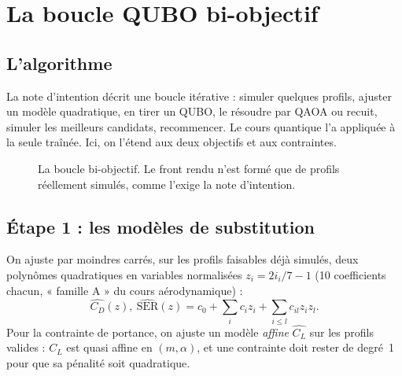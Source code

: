 \chapter{La boucle QUBO bi-objectif}\label{ch:boucle}

\section{L'algorithme}
La note d'intention décrit une boucle itérative : simuler quelques profils, ajuster un modèle quadratique, en tirer un QUBO, le résoudre par QAOA ou recuit, simuler les meilleurs candidats, recommencer. Le cours quantique l'a appliquée à la seule traînée. Ici, on l'étend aux deux objectifs et aux contraintes.

\begin{figure}[htbp]
\centering
{}
\caption{La boucle bi-objectif. Le front rendu n'est formé que de profils réellement simulés, comme l'exige la note d'intention.}\label{fig:boucle}
\end{figure}

\section{Étape 1 : les modèles de substitution}
On ajuste par moindres carrés, sur les profils faisables déjà simulés, deux polynômes quadratiques en variables normalisées $z_i=2i_i/7-1$ (10 coefficients chacun, « famille A » du cours aérodynamique) :
\[
\widehat{C_D}(z),\ \widehat{\mathrm{SER}}(z)=c_0+\sum_ic_iz_i+\sum_{i\le l}c_{il}z_iz_l .
\]
Pour la contrainte de portance, on ajuste un modèle \emph{affine} $\widehat{C_L}$ sur les profils valides : $C_L$ est quasi affine en $(m,\alpha)$, et une contrainte doit rester de degré~1 pour que sa pénalité soit quadratique.

